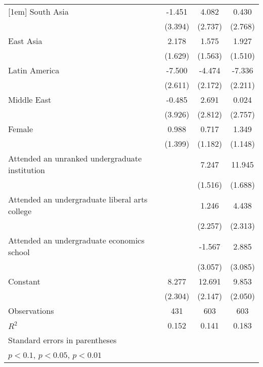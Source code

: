 \begin{table}[htbp]
\begin{tabular}{l*{3}{c}}
[1em]
South Asia          &      -1.451         &       4.082         &       0.430         \\
                    &     (3.394)         &     (2.737)         &     (2.768)         \\
[1em]
East Asia           &       2.178         &       1.575         &       1.927         \\
                    &     (1.629)         &     (1.563)         &     (1.510)         \\
[1em]
Latin America       &      -7.500\sym{***}&      -4.474\sym{**} &      -7.336\sym{***}\\
                    &     (2.611)         &     (2.172)         &     (2.211)         \\
[1em]
Middle East         &      -0.485         &       2.691         &       0.024         \\
                    &     (3.926)         &     (2.812)         &     (2.757)         \\
[1em]
Female              &       0.988         &       0.717         &       1.349         \\
                    &     (1.399)         &     (1.182)         &     (1.148)         \\
[1em]
Attended an unranked undergraduate institution&                     &       7.247\sym{***}&      11.945\sym{***}\\
                    &                     &     (1.516)         &     (1.688)         \\
[1em]
Attended an undergraduate liberal arts college&                     &       1.246         &       4.438\sym{*}  \\
                    &                     &     (2.257)         &     (2.313)         \\
[1em]
Attended an undergraduate economics school&                     &      -1.567         &       2.885         \\
                    &                     &     (3.057)         &     (3.085)         \\
[1em]
Constant            &       8.277\sym{***}&      12.691\sym{***}&       9.853\sym{***}\\
                    &     (2.304)         &     (2.147)         &     (2.050)         \\
\hline
Observations        &         431         &         603         &         603         \\
\(R^{2}\)           &       0.152         &       0.141         &       0.183         \\
\hline\hline
\multicolumn{4}{l}{\footnotesize Standard errors in parentheses}\\
\multicolumn{4}{l}{\footnotesize \sym{*} \(p<0.1\), \sym{**} \(p<0.05\), \sym{***} \(p<0.01\)}\\
\end{tabular}
\end{table}
